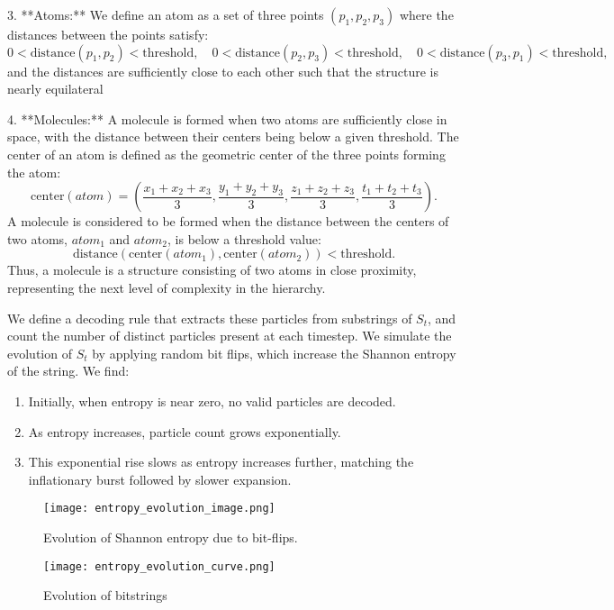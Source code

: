 \documentclass[11pt]{article}
\begin{document}
3. **Atoms:** We define an atom as a set of three points $(p_1, p_2, p_3)$ where the distances between the points satisfy:
\[
   0 < \text{distance}(p_1, p_2) < \text{threshold}, \quad 0 < \text{distance}(p_2, p_3) < \text{threshold}, \quad 0 < \text{distance}(p_3, p_1) < \text{threshold},
\]
and the distances are sufficiently close to each other such that the structure is nearly equilateral

4. **Molecules:** A molecule is formed when two atoms are sufficiently close in space, with the distance between
their centers being below a given threshold. The center of an atom is defined as the geometric center of the three points forming the atom:
\[
   \text{center}(atom) = \left( \frac{x_1 + x_2 + x_3}{3}, \frac{y_1 + y_2 + y_3}{3}, \frac{z_1 + z_2 + z_3}{3}, \frac{t_1 + t_2 + t_3}{3} \right).
\]
A molecule is considered to be formed when the distance between the centers of two atoms, $atom_1$ and $atom_2$, is below a threshold value:
\[
   \text{distance}(\text{center}(atom_1), \text{center}(atom_2)) < \text{threshold}.
\]
Thus, a molecule is a structure consisting of two atoms in close proximity, representing the next level of complexity in the hierarchy.


We define a decoding rule that extracts these particles from substrings of $S_t$, and count the number of distinct particles
present at each timestep. We simulate the evolution of $S_t$ by applying random bit flips, which increase the Shannon entropy of the string.
We find:

\begin{enumerate}
   \item Initially, when entropy is near zero, no valid particles are decoded.
   \item As entropy increases, particle count grows exponentially.
   \item This exponential rise slows as entropy increases further, matching the inflationary burst followed by slower expansion.
\end{enumerate}


\begin{figure}[h!]
   \centering
   \texttt{[image: entropy\_evolution\_image.png]}
   \caption{Evolution of Shannon entropy due to bit-flips.}
   \label{fig:Evolution of entropy due to bit-flips}
\end{figure}


\begin{figure}[h!]
   \centering
   \texttt{[image: entropy\_evolution\_curve.png]}
   \caption{Evolution of bitstrings}
   \label{fig:Evolution of bitstrings due to bit-flips}
\end{figure}
\end{document}
